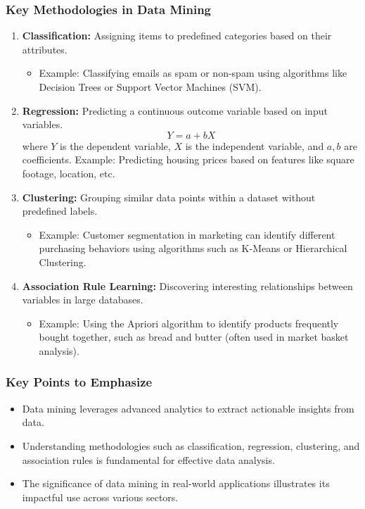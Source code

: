 \documentclass[aspectratio=169]{beamer}
\begin{document}
\begin{frame}[fragile]
    \frametitle{Key Methodologies in Data Mining}
    \begin{enumerate}
        \item \textbf{Classification:} Assigning items to predefined categories based on their attributes.  
              \begin{itemize}
                  \item Example: Classifying emails as spam or non-spam using algorithms like Decision Trees or Support Vector Machines (SVM).
              \end{itemize}
        
        \item \textbf{Regression:} Predicting a continuous outcome variable based on input variables.  
              \begin{equation}
                  Y = a + bX
              \end{equation}
              where \( Y \) is the dependent variable, \( X \) is the independent variable, and \( a, b \) are coefficients.  
              Example: Predicting housing prices based on features like square footage, location, etc.
        
        \item \textbf{Clustering:} Grouping similar data points within a dataset without predefined labels.   
              \begin{itemize}
                  \item Example: Customer segmentation in marketing can identify different purchasing behaviors using algorithms such as K-Means or Hierarchical Clustering.
              \end{itemize}
        
        \item \textbf{Association Rule Learning:} Discovering interesting relationships between variables in large databases.  
              \begin{itemize}
                  \item Example: Using the Apriori algorithm to identify products frequently bought together, such as bread and butter (often used in market basket analysis).
              \end{itemize}
    \end{enumerate}
\end{frame}

\begin{frame}[fragile]
    \frametitle{Key Points to Emphasize}
    \begin{itemize}
        \item Data mining leverages advanced analytics to extract actionable insights from data.
        \item Understanding methodologies such as classification, regression, clustering, and association rules is fundamental for effective data analysis.
        \item The significance of data mining in real-world applications illustrates its impactful use across various sectors.
    \end{itemize}
\end{frame}
\end{document}
